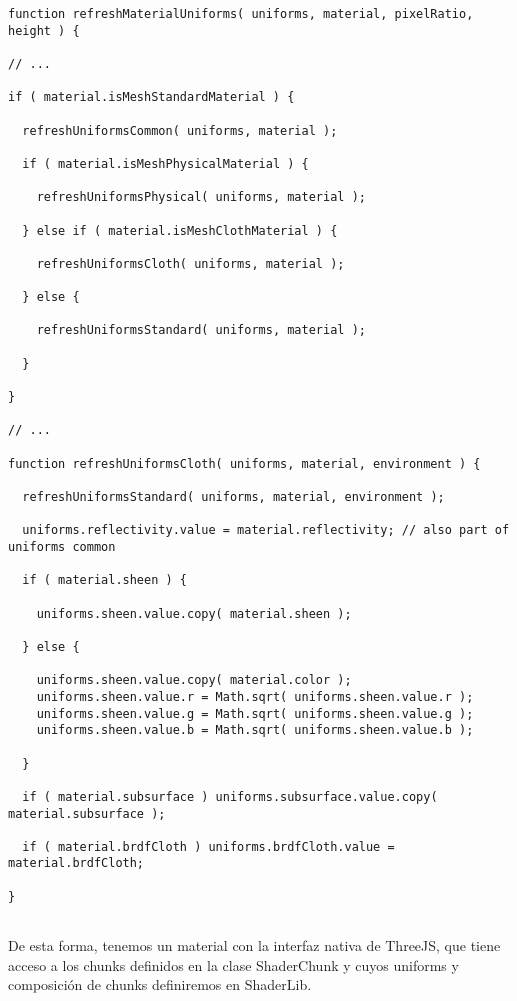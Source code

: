 \begin{lstlisting}[caption=Clase WebGLMaterials]
function refreshMaterialUniforms( uniforms, material, pixelRatio, height ) {

// ...

if ( material.isMeshStandardMaterial ) {

  refreshUniformsCommon( uniforms, material );

  if ( material.isMeshPhysicalMaterial ) {

    refreshUniformsPhysical( uniforms, material );

  } else if ( material.isMeshClothMaterial ) {

    refreshUniformsCloth( uniforms, material );

  } else {

    refreshUniformsStandard( uniforms, material );

  }

}

// ...

function refreshUniformsCloth( uniforms, material, environment ) {

  refreshUniformsStandard( uniforms, material, environment );

  uniforms.reflectivity.value = material.reflectivity; // also part of uniforms common

  if ( material.sheen ) {

    uniforms.sheen.value.copy( material.sheen );

  } else {

    uniforms.sheen.value.copy( material.color );
    uniforms.sheen.value.r = Math.sqrt( uniforms.sheen.value.r );
    uniforms.sheen.value.g = Math.sqrt( uniforms.sheen.value.g );
    uniforms.sheen.value.b = Math.sqrt( uniforms.sheen.value.b );

  }

  if ( material.subsurface ) uniforms.subsurface.value.copy( material.subsurface );

  if ( material.brdfCloth ) uniforms.brdfCloth.value = material.brdfCloth;

}
  
\end{lstlisting}

De esta forma, tenemos un material con la interfaz nativa de ThreeJS, que tiene acceso a los
chunks definidos en la clase ShaderChunk y cuyos uniforms y composici\'on de chunks definiremos
en ShaderLib.\newline

